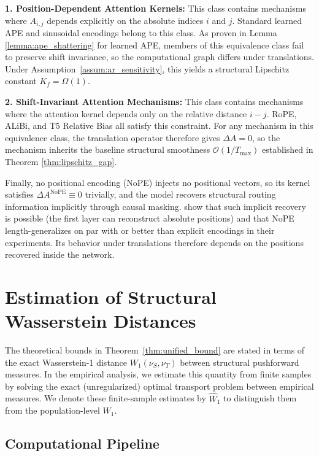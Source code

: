 \textbf{1. Position-Dependent Attention Kernels:} This class contains mechanisms where $A_{i,j}$ depends explicitly on the absolute indices $i$ and $j$. Standard learned APE and sinusoidal encodings belong to this class. As proven in Lemma \ref{lemma:ape_shattering} for learned APE, members of this equivalence class fail to preserve shift invariance, so the computational graph differs under translations. Under Assumption~\ref{assum:ar_sensitivity}, this yields a structural Lipschitz constant $K_{f} = \Omega(1)$. 

\textbf{2. Shift-Invariant Attention Mechanisms:} This class contains mechanisms where the attention kernel depends only on the relative distance $i - j$. RoPE, ALiBi, and T5 Relative Bias all satisfy this constraint. For any mechanism in this equivalence class, the translation operator therefore gives $\Delta A = 0$, so the mechanism inherits the baseline structural smoothness $\mathcal{O}(1/T_{\max})$ established in Theorem \ref{thm:lipschitz_gap}.

Finally, no positional encoding (NoPE) injects no positional vectors, so its kernel satisfies $\Delta A^{\text{NoPE}} \equiv 0$ trivially, and the model recovers structural routing information implicitly through causal masking. \citet{kazemnejad2023impactpositionalencodinglength} show that such implicit recovery is possible (the first layer can reconstruct absolute positions) and that NoPE length-generalizes on par with or better than explicit encodings in their experiments. Its behavior under translations therefore depends on the positions recovered inside the network.

\section{Estimation of Structural Wasserstein Distances}
\label{app:w1_estimation}

The theoretical bounds in Theorem~\ref{thm:unified_bound} are stated in terms of the exact Wasserstein-1 distance $W_1(\nu_S,\nu_T)$ between structural pushforward measures. 
In the empirical analysis, we estimate this quantity from finite samples by solving the exact (unregularized) optimal transport problem between empirical measures. %
We denote these finite-sample estimates by $\widehat W_{1}$ to distinguish them from the population-level $W_1$.

\subsection{Computational Pipeline}

